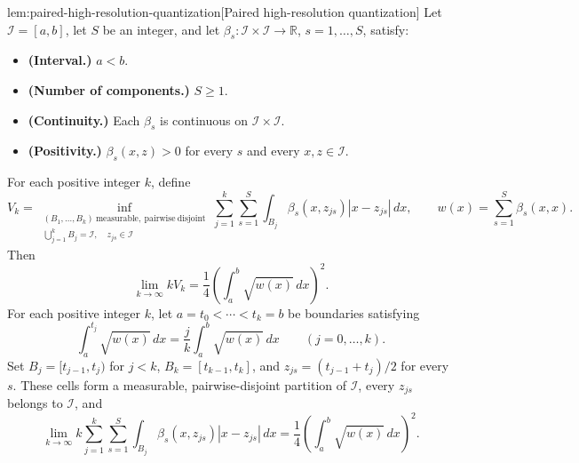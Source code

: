 \documentclass[11pt]{article}
\begin{document}
\begin{lemmav}{lem:paired-high-resolution-quantization}[Paired high-resolution quantization]
Let \(\mathcal I=[a,b]\), let \(S\) be an integer, and let \(\beta_s:\mathcal I\times\mathcal I\to\mathbb R\), \(s=1,\ldots,S\), satisfy:
\begin{itemize}
\item \textbf{(Interval.)} \(a<b\).
\item \textbf{(Number of components.)} \(S\geq1\).
\item \textbf{(Continuity.)} Each \(\beta_s\) is continuous on \(\mathcal I\times\mathcal I\).
\item \textbf{(Positivity.)} \(\beta_s(x,z)>0\) for every \(s\) and every \(x,z\in\mathcal I\).
\end{itemize}
For each positive integer \(k\), define
\[
V_k=
\inf_{\substack{(B_1,\ldots,B_k)\ \mathrm{measurable,\ pairwise\ disjoint}\\
\bigcup_{j=1}^{k}B_j=\mathcal I,\quad z_{js}\in\mathcal I}}
\sum_{j=1}^{k}\sum_{s=1}^{S}
\int_{B_j}\beta_s(x,z_{js})|x-z_{js}|\,dx,
\qquad
w(x)=\sum_{s=1}^{S}\beta_s(x,x).
\]
Then
\[
\lim_{k\to\infty}kV_k
=\frac14\left(\int_a^b\sqrt{w(x)}\,dx\right)^2.
\]
For each positive integer \(k\), let \(a=t_0<\cdots<t_k=b\) be boundaries satisfying
\[
\int_a^{t_j}\sqrt{w(x)}\,dx
=\frac{j}{k}\int_a^b\sqrt{w(x)}\,dx
\qquad (j=0,\ldots,k).
\]
Set \(B_j=[t_{j-1},t_j)\) for \(j<k\), \(B_k=[t_{k-1},t_k]\), and \(z_{js}=(t_{j-1}+t_j)/2\) for every \(s\). These cells form a measurable, pairwise-disjoint partition of \(\mathcal I\), every \(z_{js}\) belongs to \(\mathcal I\), and
\[
\lim_{k\to\infty}
k\sum_{j=1}^{k}\sum_{s=1}^{S}
\int_{B_j}\beta_s(x,z_{js})|x-z_{js}|\,dx
=\frac14\left(\int_a^b\sqrt{w(x)}\,dx\right)^2.
\]
\end{lemmav}
\end{document}
